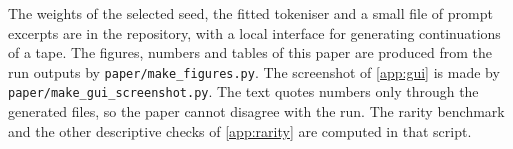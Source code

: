 \documentclass[11pt]{article}
\begin{document}
The weights of the selected seed, the fitted tokeniser and a small file of prompt excerpts are in the repository, with a local interface for generating continuations of a tape.
The figures, numbers and tables of this paper are produced from the run outputs by \texttt{paper/make\_figures.py}.
The screenshot of \cref{app:gui} is made by \texttt{paper/make\_gui\_screenshot.py}.
The text quotes numbers only through the generated files, so the paper cannot disagree with the run.
The rarity benchmark and the other descriptive checks of \cref{app:rarity} are computed in that script.
\end{document}
